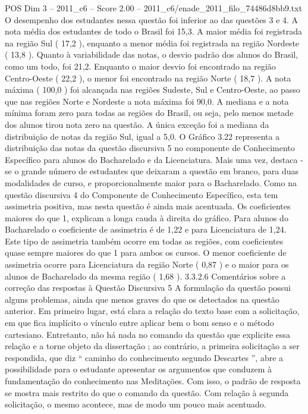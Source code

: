 \begin{textsample}{POS Dim 3 – 2011\_c6 – Score 2.00 – 2011\_c6/enade\_2011\_filo\_74486d8bb9.txt}
O desempenho dos estudantes nessa questão foi inferior ao das questões 3 e 4.
A nota média dos estudantes de todo o Brasil foi 15,3.
A maior média foi registrada na região Sul ( 17,2 ), enquanto a menor média foi registrada na região Nordeste ( 13,8 ).
Quanto à variabilidade das notas, o desvio padrão dos alunos do Brasil, como um todo, foi 21,2.
Enquanto o maior desvio foi encontrado na região Centro-Oeste ( 22,2 ), o menor foi encontrado na região Norte ( 18,7 ).
A nota máxima ( 100,0 ) foi alcançada nas regiões Sudeste, Sul e Centro-Oeste, ao passo que nas regiões Norte e Nordeste a nota máxima foi 90,0.
A mediana e a nota mínima foram zero para todas as regiões do Brasil, ou seja, pelo menos metade dos alunos tirou nota zero na questão.
A única exceção foi a mediana da distribuição de notas da região Sul, igual a 5,0.
O Gráfico 3.22 representa a distribuição das notas da questão discursiva 5 no componente de Conhecimento Específico para alunos do Bacharelado e da Licenciatura.
Mais uma vez, destaca -se o grande número de estudantes que deixaram a questão em branco, para duas modalidades de curso, e proporcionalmente maior para o Bacharelado.
Como na questão discursiva 4 do Componente de Conhecimento Específico, esta tem assimetria positiva, mas nesta questão é ainda mais acentuada.
Os coeficientes maiores do que 1, explicam a longa cauda à direita do gráfico.
Para alunos do Bacharelado o coeficiente de assimetria é de 1,22 e para Licenciatura de 1,24.
Este tipo de assimetria também ocorre em todas as regiões, com coeficientes quase sempre maiores do que 1 para ambos os cursos.
O menor coeficiente de assimetria ocorre para Licenciatura da região Norte ( 0,87 ) e o maior para os alunos de Bacharelado da mesma região ( 1,68 ). 3.3.2.6 Comentários sobre a correção das respostas à Questão Discursiva 5 A formulação da questão possui alguns problemas, ainda que menos graves do que os detectados na questão anterior.
Em primeiro lugar, está clara a relação do texto base com a solicitação, em que fica implícito o vínculo entre aplicar bem o bom senso e o método cartesiano.
Entretanto, não há nada no comando da questão que explicite essa relação e a torne objeto da dissertação ; ao contrário, a primeira solicitação a ser respondida, que diz “ caminho do conhecimento segundo Descartes ”, abre a possibilidade para o estudante apresentar os argumentos que conduzem à fundamentação do conhecimento nas Meditações.
Com isso, o padrão de resposta se mostra mais restrito do que o comando da questão.
Com relação à segunda solicitação, o mesmo acontece, mas de modo um pouco mais acentuado.

\end{textsample}
